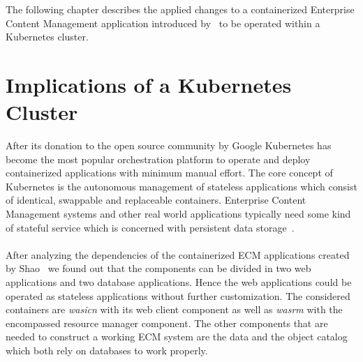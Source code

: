 \label{chap:concept}
The following chapter describes the applied changes to a containerized Enterprise Content Management application introduced by~\cite{shao} to be operated within a Kubernetes cluster.

\section{Implications of a Kubernetes Cluster}
After its donation to the open source community by Google Kubernetes has become the most popular orchestration platform to operate and deploy containerized applications with minimum manual effort.
The core concept of Kubernetes is the autonomous management of stateless applications which consist of identical, swappable and replaceable containers.
Enterprise Content Management systems and other real world applications typically need some kind of stateful service which is concerned with persistent data storage~\cite{KUB2}.
\\
\\
After analyzing the dependencies of the containerized ECM applications created by Shao~\cite{shao} we found out that the components can be divided in two web applications and two database applications.
Hence the web applications could be operated as stateless applications without further customization.
The considered containers are \textit{wasicn} with its web client component as well as \textit{wasrm} with the encompassed resource manager component.
The other components that are needed to construct a working ECM system are the data and the object catalog which both rely on databases to work properly.

